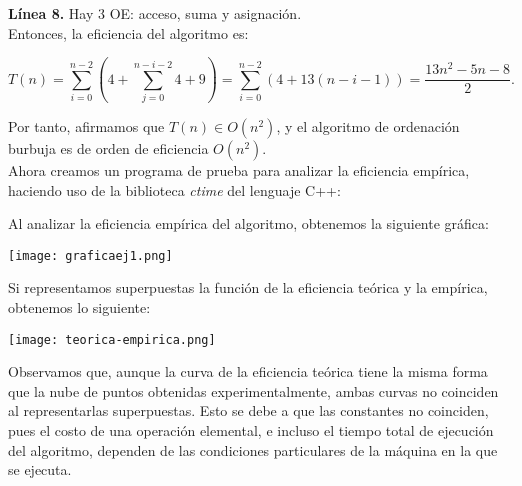 \documentclass[11pt,a4paper]{article}
\begin{document}
\textbf{Línea 8.} Hay 3 OE: acceso, suma y asignación.\\

Entonces, la eficiencia del algoritmo es:

$$ T(n) = \sum_{i=0}^{n-2} \left( 4 + \sum_{j=0}^{n-i-2} 4+9 \right) =  \sum_{i=0}^{n-2} \left( 4 + 13(n-i-1) \right) =  \frac{13n^{2}-5n-8}{2}.$$

Por tanto, afirmamos que $T(n) \in O(n^2)$, y el algoritmo de ordenación burbuja es de orden de eficiencia $O(n^2)$.\\

Ahora creamos un programa de prueba para analizar la eficiencia empírica, haciendo uso de la biblioteca \emph{ctime} del lenguaje C++:



Al analizar la eficiencia empírica del algoritmo, obtenemos la siguiente gráfica:\\

\begin{center}
	\texttt{[image: graficaej1.png]}
\end{center}

Si representamos superpuestas la función de la eficiencia teórica y la empírica, obtenemos lo siguiente:\\

\begin{center}
	\texttt{[image: teorica-empirica.png]}
\end{center}

Observamos que, aunque la curva de la eficiencia teórica tiene la misma forma que la nube de puntos obtenidas experimentalmente, ambas curvas no coinciden al representarlas superpuestas. Esto se debe a que las constantes no coinciden, pues el costo de una operación elemental, e incluso el tiempo total de ejecución del algoritmo, dependen de las condiciones particulares de la máquina en la que se ejecuta.
\end{document}
